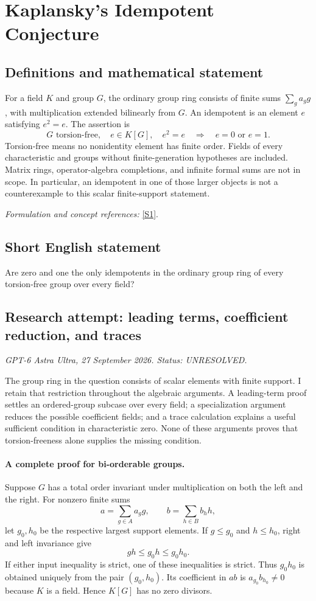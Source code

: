 \documentclass[11pt]{article}
\begin{document}
\section*{\texorpdfstring{Kaplansky's Idempotent Conjecture}{Kaplansky's Idempotent Conjecture}}\label{statement}
\subsection{Definitions and mathematical statement}
For a field $K$ and group $G$, the ordinary group ring consists of finite sums $\sum_g a_gg$, with multiplication extended bilinearly from $G$. An idempotent is an element $e$ satisfying $e^2=e$. The assertion is
\[
 G\text{ torsion-free},\quad e\in K[G],\quad e^2=e
 \quad\Longrightarrow\quad e=0\text{ or }e=1.
\]
Torsion-free means no nonidentity element has finite order. Fields of every characteristic and groups without finite-generation hypotheses are included. Matrix rings, operator-algebra completions, and infinite formal sums are not in scope. In particular, an idempotent in one of those larger objects is not a counterexample to this scalar finite-support statement.
\par\smallskip\textit{Formulation and concept references:} \href{https://arxiv.org/pdf/1904.04847}{[S1]}.

\subsection{Short English statement}
Are zero and one the only idempotents in the ordinary group ring of every torsion-free group over every field?
\subsection{Research attempt: leading terms, coefficient reduction, and traces}
\textit{GPT-6 Astra Ultra, 27 September 2026. Status: UNRESOLVED.}

The group ring in the question consists of scalar elements with finite support. I retain that restriction throughout the algebraic arguments. A leading-term proof settles an ordered-group subcase over every field; a specialization argument reduces the possible coefficient fields; and a trace calculation explains a useful sufficient condition in characteristic zero. None of these arguments proves that torsion-freeness alone supplies the missing condition.

\paragraph{A complete proof for bi-orderable groups.}
Suppose $G$ has a total order invariant under multiplication on both the left and the right. For nonzero finite sums
\[
 a=\sum_{g\in A}a_g g,\qquad b=\sum_{h\in B}b_h h,
\]
let $g_0,h_0$ be the respective largest support elements. If $g\le g_0$ and $h\le h_0$, right and left invariance give
\[
 gh\le g_0h\le g_0h_0.
\]
If either input inequality is strict, one of these inequalities is strict. Thus $g_0h_0$ is obtained uniquely from the pair $(g_0,h_0)$. Its coefficient in $ab$ is $a_{g_0}b_{h_0}\ne0$ because $K$ is a field. Hence $K[G]$ has no zero divisors.
\end{document}
